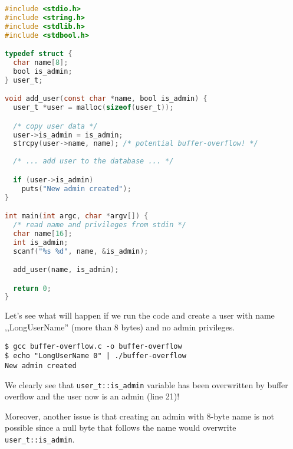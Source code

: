 \documentclass[shortabstract, manyadvisors, english, mgr]{iithesis}
\theoremstyle{definition} \newtheorem*{definition}{Definicja}
\theoremstyle{definition} \newtheorem*{example}{Przykład}
\theoremstyle{definition} \newtheorem*{remark}{Uwaga}
\begin{document}
\begin{lstlisting}[language=C, caption=A code containing buffer overflow bug., label={lst:buffer-overflow}]
#include <stdio.h>
#include <string.h>
#include <stdlib.h>
#include <stdbool.h>

typedef struct {
  char name[8];
  bool is_admin;
} user_t;

void add_user(const char *name, bool is_admin) {
  user_t *user = malloc(sizeof(user_t));

  /* copy user data */
  user->is_admin = is_admin;
  strcpy(user->name, name); /* potential buffer-overflow! */
  
  /* ... add user to the database ... */

  if (user->is_admin)
    puts("New admin created");
}

int main(int argc, char *argv[]) {
  /* read name and privileges from stdin */
  char name[16];
  int is_admin;
  scanf("%s %d", name, &is_admin);

  add_user(name, is_admin);

  return 0;
}
\end{lstlisting}

Let's see what will happen if we run the code and create a user with name ,,LongUserName'' (more than 8 bytes) and no admin privileges.

\begin{lstlisting}[caption=Exploiting buffer overflow bug in listing \ref{lst:buffer-overflow}.]
$ gcc buffer-overflow.c -o buffer-overflow
$ echo "LongUserName 0" | ./buffer-overflow
New admin created
\end{lstlisting}

We clearly see that \texttt{user\_t::is\_admin} variable has been overwritten by buffer overflow and the user now is an admin (line 21)!

Moreover, another issue is that creating an admin with 8-byte name is not possible since a null byte that follows the name would overwrite \texttt{user\_t::is\_admin}.
\end{document}
